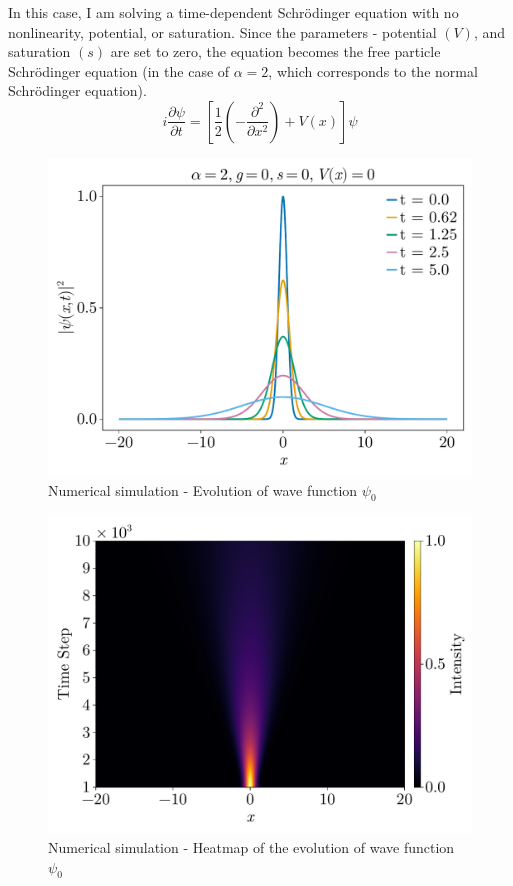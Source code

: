 \documentclass[8pt, a4paper, twocolumn]{article}
\begin{document}
In this case, I am solving a time-dependent Schrödinger equation with no nonlinearity, 
potential, or saturation. Since the parameters - potential $(V)$, and saturation $(s)$ 
are set to zero, the equation becomes the free particle Schrödinger equation (in the case of $\alpha=2$, 
which corresponds to the normal Schrödinger equation).
\begin{equation}
    i \frac{\partial \psi}{\partial t} = \left[ \frac{1}{2} \left( - \frac{\partial^2}
	{\partial x^2}\right) + V(x) \right] \psi
\end{equation}
\begin{figure}[h]
	\centering
	\includegraphics[width=\linewidth]{../figs/lse_evolution.pdf}
	\caption{Numerical simulation - Evolution of wave function $\psi_0$}
	\label{fig:lse_evolution}
\end{figure}
\begin{figure}[h!]
	\centering
	\includegraphics[width=\linewidth]{../figs/lse_heatmap.pdf}
	\caption{Numerical simulation - Heatmap of the evolution of wave function $\psi_0$}
	\label{fig:lse_heatmap}
\end{figure}
\end{document}
